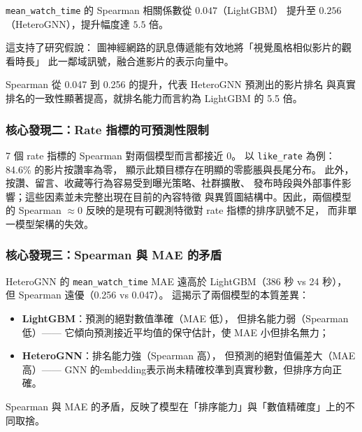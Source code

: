 \documentclass[12pt, a4paper]{article}
\begin{document}
\begin{keybox}[最重要的發現]
\texttt{mean\_watch\_time} 的 Spearman 相關係數從 $0.047$（LightGBM）
提升至 $\mathbf{0.256}$（HeteroGNN），提升幅度達 $\mathbf{5.5}$ 倍。

這支持了研究假說：
圖神經網路的訊息傳遞能有效地將「視覺風格相似影片的觀看時長」
此一鄰域訊號，融合進影片的表示向量中。
\end{keybox}

Spearman 從 0.047 到 0.256 的提升，代表 HeteroGNN 預測出的影片排名
與真實排名的一致性顯著提高，就排名能力而言約為 LightGBM 的 5.5 倍。

\subsubsection{核心發現二：Rate 指標的可預測性限制}

\begin{sloppypar}
7 個 rate 指標的 Spearman 對兩個模型而言都接近 $0$。
以 \texttt{like\_rate} 為例：84.6\% 的影片按讚率為零，
顯示此類目標存在明顯的零膨脹與長尾分布。
此外，按讚、留言、收藏等行為容易受到曝光策略、社群擴散、
發布時段與外部事件影響；這些因素並未完整出現在目前的內容特徵
與異質圖結構中。因此，兩個模型的 Spearman $\approx 0$
反映的是現有可觀測特徵對 rate 指標的排序訊號不足，
而非單一模型架構的失效。
\end{sloppypar}

\subsubsection{核心發現三：Spearman 與 MAE 的矛盾}

HeteroGNN 的 \texttt{mean\_watch\_time} MAE 遠高於 LightGBM（386 秒 vs 24 秒），
但 Spearman 遠優（0.256 vs 0.047）。
這揭示了兩個模型的本質差異：
\begin{itemize}[leftmargin=*]
\item \textbf{LightGBM}：預測的絕對數值準確（MAE 低），
      但排名能力弱（Spearman 低）——
      它傾向預測接近平均值的保守估計，使 MAE 小但排名無力；
\item \textbf{HeteroGNN}：排名能力強（Spearman 高），
      但預測的絕對值偏差大（MAE 高）——
      GNN 的embedding表示尚未精確校準到真實秒數，但排序方向正確。
\end{itemize}
Spearman 與 MAE 的矛盾，反映了模型在「排序能力」與「數值精確度」上的不同取捨。
\newpage
\end{document}
